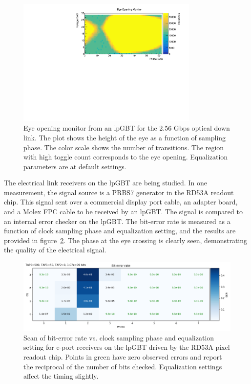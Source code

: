 \documentclass[a4paper,11pt]{article}
\begin{document}

\begin{figure}[htbp]
\centering
\includegraphics[width=0.8\textwidth,origin=c]{../figures/lpGBT_eye.pdf}
\caption{
\label{fig:lpgbt_eye}
Eye opening monitor from an lpGBT for the 2.56 Gbps optical down link.
The plot shows the height of the eye as a function of sampling phase.
The color scale shows the number of transitions.
The region with high toggle count corresponds to the eye opening.
Equalization parameters are at default settings.
}
\end{figure}


The electrical link receivers on the lpGBT are being studied.
In one measurement, the signal source is a PRBS7 generator in the RD53A readout chip.
This signal sent over a commercial display port cable, an adapter board, and a Molex FPC cable to be received by an lpGBT.
The signal is compared to an internal error checker on the lpGBT.
The bit-error rate is measured as a function of clock sampling phase and equalization setting, and the results are provided in figure~\ref{fig:lpgbt_bert}.
The phase at the eye crossing is clearly seen, demonstrating the quality of the electrical signal.


\begin{figure}[htbp]
\centering
\includegraphics[width=1.0\textwidth,origin=c]{../figures/lpGBT_bert.png}
\caption{
\label{fig:lpgbt_bert}
Scan of bit-error rate vs. clock sampling phase and equalization setting for e-port receivers on the lpGBT driven by the RD53A pixel readout chip.
Points in green have zero observed errors and report the reciprocal of the number of bits checked.
Equalization settings affect the timing slightly.
}
\end{figure}
\end{document}

